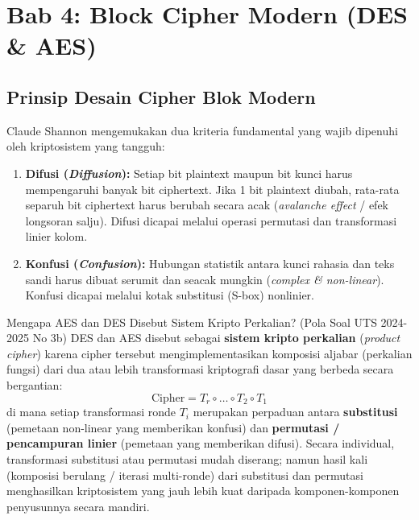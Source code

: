 \documentclass[11pt,a4paper]{article}
\begin{document}
\newpage
\section{Bab 4: Block Cipher Modern (DES \& AES)}

\subsection{Prinsip Desain Cipher Blok Modern}
Claude Shannon mengemukakan dua kriteria fundamental yang wajib dipenuhi oleh kriptosistem yang tangguh:
\begin{enumerate}[leftmargin=*]
    \item \textbf{Difusi (\textit{Diffusion}):} Setiap bit plaintext maupun bit kunci harus mempengaruhi banyak bit ciphertext. Jika 1 bit plaintext diubah, rata-rata separuh bit ciphertext harus berubah secara acak (\textit{avalanche effect} / efek longsoran salju). Difusi dicapai melalui operasi permutasi dan transformasi linier kolom.
    \item \textbf{Konfusi (\textit{Confusion}):} Hubungan statistik antara kunci rahasia dan teks sandi harus dibuat serumit dan seacak mungkin (\textit{complex \& non-linear}). Konfusi dicapai melalui kotak substitusi (S-box) nonlinier.
\end{enumerate}

\begin{thmbox}{Mengapa AES dan DES Disebut Sistem Kripto Perkalian? (Pola Soal UTS 2024-2025 No 3b)}
DES dan AES disebut sebagai \textbf{sistem kripto perkalian} (\textit{product cipher}) karena cipher tersebut mengimplementasikan komposisi aljabar (perkalian fungsi) dari dua atau lebih transformasi kriptografi dasar yang berbeda secara bergantian:
\[
\text{Cipher} = T_r \circ \dots \circ T_2 \circ T_1
\]
di mana setiap transformasi ronde $T_i$ merupakan perpaduan antara \textbf{substitusi} (pemetaan non-linear yang memberikan konfusi) dan \textbf{permutasi / pencampuran linier} (pemetaan yang memberikan difusi). Secara individual, transformasi substitusi atau permutasi mudah diserang; namun hasil kali (komposisi berulang / iterasi multi-ronde) dari substitusi dan permutasi menghasilkan kriptosistem yang jauh lebih kuat daripada komponen-komponen penyusunnya secara mandiri.
\end{thmbox}
\end{document}
